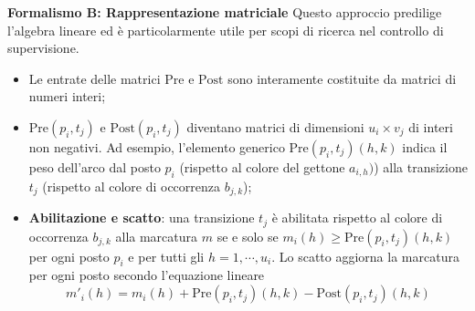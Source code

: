 \noindent \textbf{Formalismo B: Rappresentazione matriciale}
Questo approccio predilige l'algebra lineare ed è particolarmente utile per scopi di ricerca nel controllo di supervisione.
\begin{itemize}
	\item Le entrate delle matrici $\text{Pre}$ e $\text{Post}$ sono interamente costituite da matrici di numeri interi;
	\item $\text{Pre}(p_i, t_j)$ e $\text{Post}(p_i, t_j)$ diventano matrici di dimensioni $u_i \times v_j$ di interi non negativi. Ad esempio, l'elemento generico $\text{Pre}(p_i, t_j)(h, k)$ indica il peso dell'arco dal posto $p_i$ (rispetto al colore del gettone $a_{i,h})$) alla transizione $t_j$ (rispetto al colore di occorrenza $b_{j,k}$);
	\item \textbf{Abilitazione e scatto}: una transizione $t_j$ è abilitata rispetto al colore di occorrenza $b_{j,k}$ alla marcatura $m$ se e solo se $m_i(h) \ge \text{Pre}(p_i, t_j)(h,k)$ per ogni posto $p_i$ e per tutti gli $h= 1,\cdots, u_i$. Lo scatto aggiorna la marcatura per ogni posto secondo l'equazione lineare
	\begin{equation}
		m'_i(h) = m_i(h) + \text{Pre}(p_i, t_j)(h,k) - \text{Post}(p_i, t_j)(h,k) 
	\end{equation}
\end{itemize}

